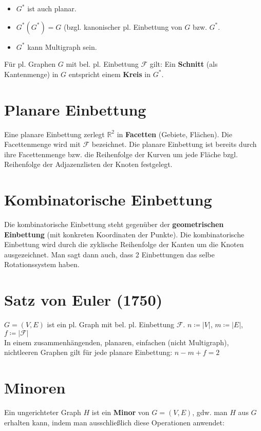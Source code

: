 \documentclass[a4paper,11pt]{report}
\begin{document}
\begin{itemize}
    \item $G^*$ ist auch planar.
    \item $G^*(G^*) = G$ (bzgl. kanonischer pl. Einbettung von $G$ bzw. $G^*$.
    \item $G^*$ kann Multigraph sein.
\end{itemize}

Für pl. Graphen $G$ mit bel. pl. Einbettung $\mathcal{F}$ gilt: Ein {\bf Schnitt} (als Kantenmenge) in $G$ entspricht einem {\bf Kreis} in $G^*$.


\section{Planare Einbettung}
Eine planare Einbettung zerlegt $\mathbb{R}^2$ in {\bf Facetten} (Gebiete, Flächen). Die Facettenmenge wird mit $\mathcal{F}$ bezeichnet. Die planare Einbettung ist bereits durch ihre Facettenmenge bzw. die Reihenfolge der Kurven um jede Fläche bzgl. Reihenfolge der Adjazenzlisten der Knoten festgelegt.


\section{Kombinatorische Einbettung}
Die kombinatorische Einbettung steht gegenüber der {\bf geometrischen Einbettung} (mit konkreten Koordinaten der Punkte). Die kombinatorische Einbettung wird durch die zyklische Reihenfolge der Kanten um die Knoten ausgezeichnet. Man sagt dann auch, dass 2 Einbettungen das selbe Rotationssystem haben.


\section{Satz von Euler (1750)}
$G = (V, E)$ ist ein pl. Graph mit bel. pl. Einbettung $\mathcal{F}$. $n \coloneqq |V|$, $m \coloneqq |E|$, $f \coloneqq |\mathcal{F}|$\\

In einem zusammenhängenden, planaren, einfachen (nicht Multigraph), nichtleeren Graphen gilt für jede planare Einbettung: $n - m + f = 2$

\section{Minoren}
Ein ungerichteter Graph $H$ ist ein {\bf Minor} von $G = (V, E)$, gdw. man $H$ aus $G$ erhalten kann, indem man ausschließlich diese Operationen anwendet:
\end{document}
